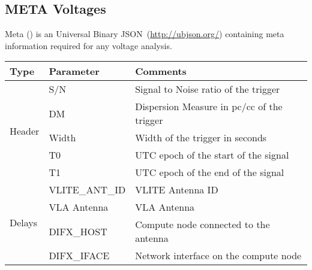 \subsection {META Voltages}
\label{ssub:metar}
\par Meta (\meta) is an Universal Binary JSON~(\url{http://ubjson.org/}) containing meta information required for any voltage analysis.
\begin{table}[]
	\label{tab:metar}
	\begin{tabular}{lll} \toprule
		Type                     & Parameter      & Comments                                                                                                               \\ \midrule
		\multirow{5}{*}{Header}  & S/N            & Signal to Noise ratio of the trigger                                                                                   \\
														 & DM             & Dispersion Measure in pc/cc of the trigger                                                                             \\
														 & Width          & Width of the trigger in seconds                                                                                        \\
														 & T0             & UTC epoch of the start of the signal                                                                                   \\
														 & T1             & UTC epoch of the end of the signal                                                                                     \\ \midrule
		\multirow{8}{*}{Delays}  & VLITE\_ANT\_ID & VLITE Antenna ID                                                                                                       \\
														 & VLA Antenna    & VLA Antenna                                                                                                            \\
														 & DIFX\_HOST     & Compute node connected to the antenna                                                                                  \\
														 & DIFX\_IFACE    & Network interface on the compute node                                                                                  \\

\end{tabular}
\end{table}
